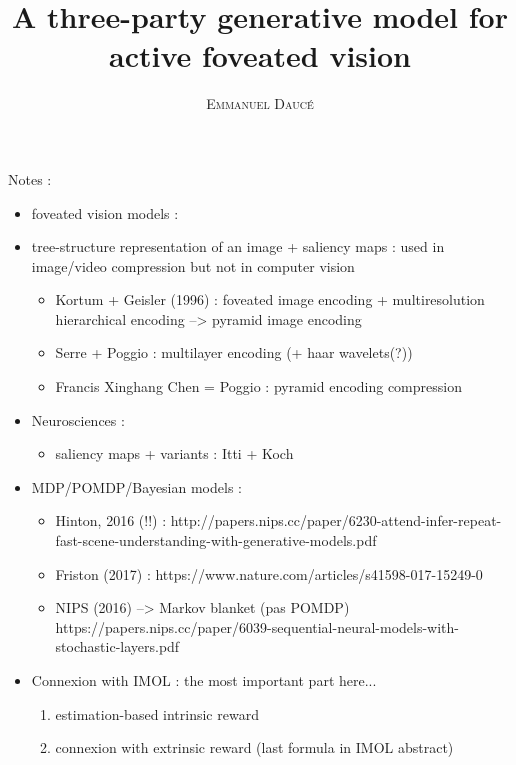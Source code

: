 \documentclass[12pt,twoside,openright]{article}
\title{\textbf{A three-party generative model for active foveated vision} }
\author{\textsc{Emmanuel Daucé}}%
\date{}
\begin{document}
	
\maketitle
	
	{\color{magenta} Notes :
	\begin{itemize}
		\item foveated vision models :  
		\item tree-structure representation of an image + saliency maps : used in image/video compression but not in computer vision
		\begin{itemize}
			\item Kortum + Geisler (1996) : foveated image encoding + multiresolution hierarchical encoding --> pyramid image encoding
			\item Serre + Poggio : multilayer encoding (+ haar wavelets(?))
			\item Francis Xinghang Chen = Poggio : pyramid encoding compression 
		\end{itemize} 	
		\item Neurosciences : 
		\begin{itemize}
			\item saliency maps + variants : Itti + Koch
		\end{itemize}
		\item MDP/POMDP/Bayesian models :
		\begin{itemize}
			\item Hinton, 2016 (!!) : http://papers.nips.cc/paper/6230-attend-infer-repeat-fast-scene-understanding-with-generative-models.pdf
			\item Friston (2017) : https://www.nature.com/articles/s41598-017-15249-0
			\item NIPS (2016) --> Markov blanket (pas POMDP) https://papers.nips.cc/paper/6039-sequential-neural-models-with-stochastic-layers.pdf
		\end{itemize}
		\item Connexion with IMOL : the most important part here...
		\begin{enumerate}
			\item estimation-based intrinsic reward
			\item connexion with extrinsic reward (last formula in IMOL abstract)
		\end{enumerate}
	\end{itemize}
	}
	
\end{document}
